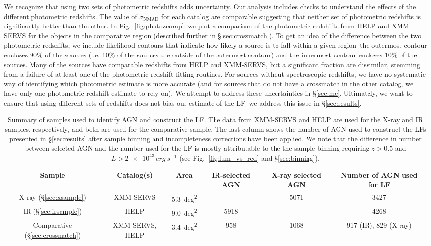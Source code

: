 \documentclass[twocolumn, trackchanges]{aastex63}
\begin{document}
We recognize that using two sets of photometric redshifts adds uncertainty.
Our analysis includes checks to understand the effects of the different photometric redshifts.
The value of $\sigma_\mathrm{NMAD}$ for each catalog are comparable suggesting that neither set of photometric redshifts is significantly better than the other.
In Fig.~\ref{fig:photozcomp}, we plot a comparison of the photometric redshifts from HELP and XMM-SERVS for the objects in the comparative region (described further in \S\ref{sec:crossmatch}).
To get an idea of the difference between the two photometric redshifts, we include likelihood contours that indicate how likely a source is to fall within a given region--the outermost contour encloses 90\% of the sources (i.e. 10\% of the sources are outside of the outermost contour) and the innermost contour encloses 10\% of the sources.
Many of the sources have comparable redshifts from HELP and XMM-SERVS, but a significant fraction are dissimilar, stemming from a failure of at least one of the photometric redshift fitting routines.
For sources without spectroscopic redshifts, we have no systematic way of identifying which photometric estimate is more accurate (and for sources that do not have a crossmatch in the other catalog, we have only one photometric redshift estimate to rely on).
We attempt to address these uncertainties in \S\ref{sec:mc}.
Ultimately, we want to ensure that using different sets of redshifts does not bias our estimate of the LF; we address this issue in \S\ref{sec:results}.

\begin{table*}[hptb]
\centering
\begin{tabular}{c c c c c c}
\hline
Sample & Catalog(s) & Area & IR-selected AGN & X-ray selected AGN & Number of AGN used for LF \\\hline\hline
X-ray (\S\ref{sec:xsample}) & XMM-SERVS & \SI{5.3}{deg^2} & --- & 5071 & 3427 \\
IR (\S\ref{sec:irsample}) & HELP & \SI{9.0}{deg^2} & 5918 & --- & 4268 \\
Comparative (\S\ref{sec:crossmatch}) & XMM-SERVS, HELP & \SI{3.4}{deg^2} & 958 & 1068 & 917 (IR), 829 (X-ray) \\
\hline
\end{tabular}
\caption{Summary of samples used to identify AGN and construct the LF. The data from XMM-SERVS \citep{chen_xmm-servs_2018} and HELP \citep{shirley_help_2019, shirley_help_2021} are used for the X-ray and IR samples, respectively, and both are used for the comparative sample. The last column shows the number of AGN used to construct the LFs presented in \S\ref{sec:results} after sample binning and incompleteness corrections have been applied. We note that the difference in number between selected AGN and the number used for the LF is mostly attributable to the the sample binning requiring $z > 0.5$ and $ L > \SI{2e43}{erg~s^{-1}} $ (see Fig.~\ref{fig:lum_vs_red} and \S\ref{sec:binning}).}
\label{tab:samples}
\end{table*}
\end{document}
